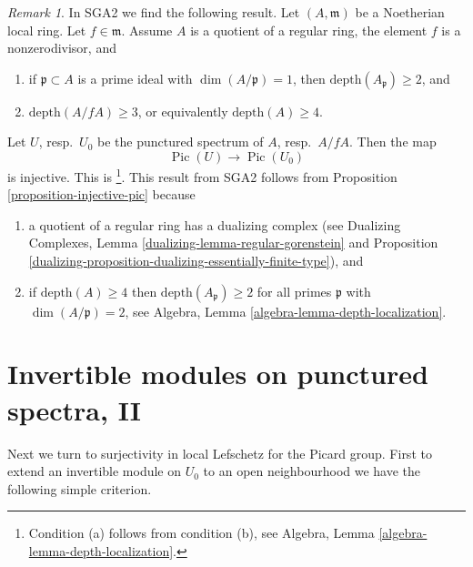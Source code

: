 \documentclass{stacks-project}
\theoremstyle{plain}
\theoremstyle{definition}
\theoremstyle{remark}
\newtheorem{remark}[subsection]{Remark}
\numberwithin{equation}{subsection}
\def\Pic{\mathop{\mathrm{Pic}}\nolimits}
\begin{document}
\begin{remark}
\label{remark-compare-SGA2}
In SGA2 we find the following result. Let $(A, \mathfrak m)$ be a
Noetherian local ring. Let $f \in \mathfrak m$. Assume $A$
is a quotient of a regular ring, the element
$f$ is a nonzerodivisor, and
\begin{enumerate}
\item[(a)] if $\mathfrak p \subset A$ is a prime ideal with
$\dim(A/\mathfrak p) = 1$, then $\text{depth}(A_\mathfrak p) \geq 2$, and
\item[(b)] $\text{depth}(A/fA) \geq 3$, or equivalently
$\text{depth}(A) \geq 4$.
\end{enumerate}
Let $U$, resp.\ $U_0$ be the punctured spectrum of $A$, resp.\ $A/fA$. Then
the map
$$
\Pic(U) \to \Pic(U_0)
$$
is injective. This is \cite[Exposee XI, Lemma 3.16]{SGA2}\footnote{Condition
(a) follows from condition (b), see
Algebra, Lemma \ref{algebra-lemma-depth-localization}.}. This result
from SGA2 follows from Proposition \ref{proposition-injective-pic}
because
\begin{enumerate}
\item a quotient of a regular ring has a dualizing complex (see
Dualizing Complexes, Lemma \ref{dualizing-lemma-regular-gorenstein} and
Proposition \ref{dualizing-proposition-dualizing-essentially-finite-type}), and
\item if $\text{depth}(A) \geq 4$ then $\text{depth}(A_\mathfrak p) \geq 2$
for all primes $\mathfrak p$ with $\dim(A/\mathfrak p) = 2$, see
Algebra, Lemma \ref{algebra-lemma-depth-localization}.
\end{enumerate}
\end{remark}






\section{Invertible modules on punctured spectra, II}
\label{section-local-lefschetz-for-pic-surjective}

\noindent
Next we turn to surjectivity in local Lefschetz for the Picard group.
First to extend an invertible module on $U_0$ to an open neighbourhood
we have the following simple criterion.
\end{document}
